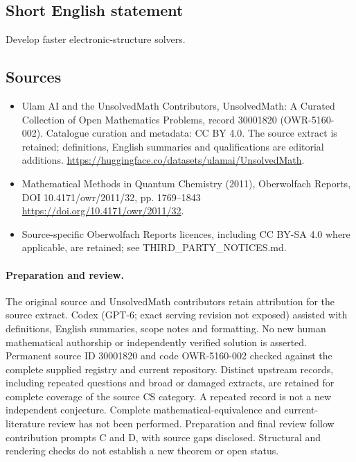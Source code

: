 \documentclass[11pt]{article}
\begin{document}
\subsection{Short English statement}
Develop faster electronic-structure solvers.
\subsection{Sources}
\begin{itemize}
\item[\hypertarget{source:30001820:1}{S1}] Ulam AI and the UnsolvedMath Contributors, UnsolvedMath: A Curated Collection of Open Mathematics Problems, record 30001820 (OWR-5160-002). Catalogue curation and metadata: CC BY 4.0. The source extract is retained; definitions, English summaries and qualifications are editorial additions.
\url{https://huggingface.co/datasets/ulamai/UnsolvedMath}.
\item[\hypertarget{source:30001820:2}{S2}] Mathematical Methods in Quantum Chemistry (2011), Oberwolfach Reports, DOI 10.4171/owr/2011/32, pp. 1769--1843
\url{https://doi.org/10.4171/owr/2011/32}.
\item Source-specific Oberwolfach Reports licences, including CC BY-SA 4.0 where applicable, are retained; see THIRD\_PARTY\_NOTICES.md.
\end{itemize}
\paragraph{Preparation and review.}
The original source and UnsolvedMath contributors retain attribution for the source extract. Codex (GPT-6; exact serving revision not exposed) assisted with definitions, English summaries, scope notes and formatting. No new human mathematical authorship or independently verified solution is asserted. Permanent source ID 30001820 and code OWR-5160-002 checked against the complete supplied registry and current repository. Distinct upstream records, including repeated questions and broad or damaged extracts, are retained for complete coverage of the source CS category. A repeated record is not a new independent conjecture. Complete mathematical-equivalence and current-literature review has not been performed. Preparation and final review follow contribution prompts C and D, with source gaps disclosed. Structural and rendering checks do not establish a new theorem or open status.
\label{end:30001820}
\end{document}
